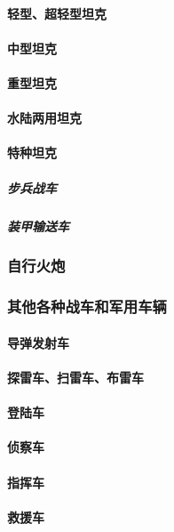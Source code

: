 \documentclass[UTF8]{../ApplicationUniverse}
\begin{document}
            \paragraph{轻型、超轻型坦克}
            \paragraph{中型坦克}
            \paragraph{重型坦克}
            \paragraph{水陆两用坦克}
            \paragraph{特种坦克}
                \subparagraph{步兵战车}
                \subparagraph{装甲输送车}
        \subsubsection{自行火炮}
        \subsubsection{其他各种战车和军用车辆}
            \paragraph{导弹发射车}
            \paragraph{探雷车、扫雷车、布雷车}
            \paragraph{登陆车}
            \paragraph{侦察车}
            \paragraph{指挥车}
            \paragraph{救援车}
\end{document}
